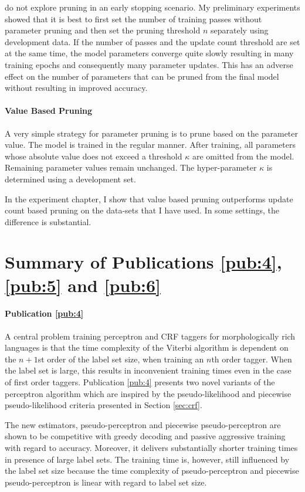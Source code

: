 \cite{Goldberg2011} do not explore pruning in an early stopping
scenario. My preliminary experiments showed that it is best to first
set the number of training passes without parameter pruning and then
set the pruning threshold $n$ separately using development data. If the
number of passes and the update count threshold are set at the same
time, the model parameters converge quite slowly resulting in many
training epochs and consequently many parameter updates. This has an
adverse effect on the number of parameters that can be pruned from the
final model without resulting in improved accuracy.

\paragraph{Value Based Pruning} A very simple strategy for
parameter pruning is to prune based on the parameter value. The model
is trained in the regular manner. After training, all parameters whose
absolute value does not exceed a threshold $\kappa$ are omitted from
the model. Remaining parameter values remain unchanged. The
hyper-parameter $\kappa$ is determined using a development set.

In the experiment chapter, I show that value based pruning outperforms
update count based pruning on the data-sets that I have used. In some
settings, the difference is substantial.

\section{Summary of Publications \ref{pub:4}, \ref{pub:5} and \ref{pub:6}}

\paragraph{Publication \ref{pub:4}} A central problem training
perceptron and CRF taggers for morphologically rich languages is that
the time complexity of the Viterbi algorithm is dependent on the
$n+1$st order of the label set size, when training an $n$th order
tagger. When the label set is large, this results in inconvenient
training times even in the case of first order taggers. Publication
\ref{pub:4} presents two novel variants of the perceptron algorithm
which are inspired by the pseudo-likelihood and piecewise
pseudo-likelihood criteria presented in Section \ref{sec:crf}.

The new estimators, pseudo-perceptron and piecewise pseudo-perceptron
are shown to be competitive with greedy decoding and passive
aggressive training with regard to accuracy. Moreover, it delivers
substantially shorter training times in presence of large label
sets. The training time is, however, still influenced by the label set
size because the time complexity of pseudo-perceptron and piecewise
pseudo-perceptron is linear with regard to label set size.

